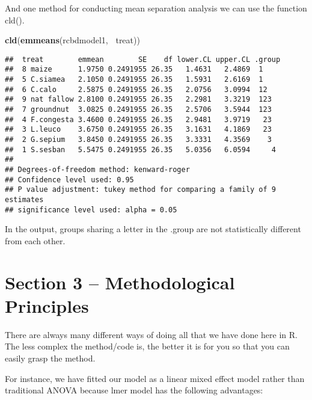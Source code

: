 \documentclass[]{book}
\newenvironment{Shaded}{\begin{snugshade}}{\end{snugshade}}
\newcommand{\KeywordTok}[1]{\textcolor[rgb]{0.13,0.29,0.53}{\textbf{#1}}}
\newcommand{\OperatorTok}[1]{\textcolor[rgb]{0.81,0.36,0.00}{\textbf{#1}}}
\newcommand{\NormalTok}[1]{#1}
\theoremstyle{definition}
\theoremstyle{definition}
\theoremstyle{definition}
\theoremstyle{remark}
\begin{document}
And one method for conducting mean separation analysis we can use the
function cld().

\begin{Shaded}
\begin{Highlighting}[]
\KeywordTok{cld}\NormalTok{(}\KeywordTok{emmeans}\NormalTok{(rcbdmodel1, }\OperatorTok{~}\NormalTok{treat))}
\end{Highlighting}
\end{Shaded}

\begin{verbatim}
##  treat        emmean        SE    df lower.CL upper.CL .group
##  8 maize      1.9750 0.2491955 26.35   1.4631   2.4869  1    
##  5 C.siamea   2.1050 0.2491955 26.35   1.5931   2.6169  1    
##  6 C.calo     2.5875 0.2491955 26.35   2.0756   3.0994  12   
##  9 nat fallow 2.8100 0.2491955 26.35   2.2981   3.3219  123  
##  7 groundnut  3.0825 0.2491955 26.35   2.5706   3.5944  123  
##  4 F.congesta 3.4600 0.2491955 26.35   2.9481   3.9719   23  
##  3 L.leuco    3.6750 0.2491955 26.35   3.1631   4.1869   23  
##  2 G.sepium   3.8450 0.2491955 26.35   3.3331   4.3569    3  
##  1 S.sesban   5.5475 0.2491955 26.35   5.0356   6.0594     4 
## 
## Degrees-of-freedom method: kenward-roger 
## Confidence level used: 0.95 
## P value adjustment: tukey method for comparing a family of 9 estimates 
## significance level used: alpha = 0.05
\end{verbatim}

In the output, groups sharing a letter in the .group are not
statistically different from each other.

\section{Section 3 -- Methodological
Principles}\label{section-3-methodological-principles}

There are always many different ways of doing all that we have done here
in R. The less complex the method/code is, the better it is for you so
that you can easily grasp the method.

For instance, we have fitted our model as a linear mixed effect model
rather than traditional ANOVA because lmer model has the following
advantages:
\end{document}
